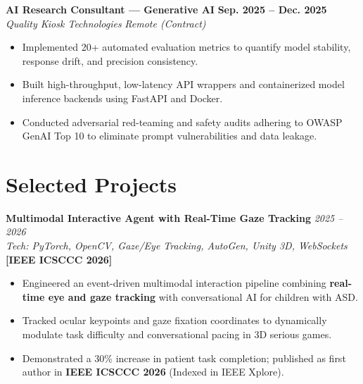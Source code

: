 \documentclass[10pt,a4paper]{article}
\begin{document}
\vspace{2.5pt}
\noindent\textbf{AI Research Consultant --- Generative AI} \hfill \textbf{Sep. 2025 -- Dec. 2025} \\
\textit{Quality Kiosk Technologies} \hfill \textit{Remote (Contract)}
\begin{itemize}
    \item Implemented 20+ automated evaluation metrics to quantify model stability, response drift, and precision consistency.
    \item Built high-throughput, low-latency API wrappers and containerized model inference backends using FastAPI and Docker.
    \item Conducted adversarial red-teaming and safety audits adhering to OWASP GenAI Top 10 to eliminate prompt vulnerabilities and data leakage.
\end{itemize}

\section*{Selected Projects}

\noindent\textbf{Multimodal Interactive Agent with Real-Time Gaze Tracking} \hfill \textit{2025 -- 2026} \\
\small\textit{Tech: PyTorch, OpenCV, Gaze/Eye Tracking, AutoGen, Unity 3D, WebSockets} \hfill \textbf{[IEEE ICSCCC 2026]}
\begin{itemize}
    \item Engineered an event-driven multimodal interaction pipeline combining \textbf{real-time eye and gaze tracking} with conversational AI for children with ASD.
    \item Tracked ocular keypoints and gaze fixation coordinates to dynamically modulate task difficulty and conversational pacing in 3D serious games.
    \item Demonstrated a 30\% increase in patient task completion; published as first author in \textbf{IEEE ICSCCC 2026} (Indexed in IEEE Xplore).
\end{itemize}
\end{document}
